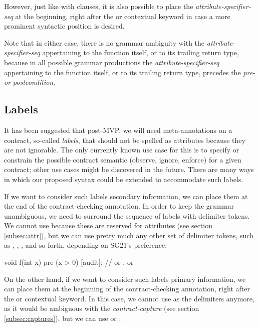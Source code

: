 However, just like with  clauses, it is also possible to place the \emph{attribute-specifier-seq} at the beginning, right after the  or  contextual keyword in case a more prominent syntactic position is desired.

Note that in either case, there is no grammar ambiguity with the \emph{attribute-specifier-seq} appertaining to the function itself, or to its trailing return type, because in all possible grammar productions the \emph{attribute-specifier-seq} appertaining to the function itself, or to its trailing return type, precedes the \emph{pre-or-postcondition}.

\subsection{Labels}
\label{subsec:labels}

It has been suggested that post-MVP, we will need meta-annotations on a contract, so-called \emph{labels}, that should not be spelled as attributes because they are not ignorable. The only currently known use case for this is to specify or constrain the possible contract semantic (observe, ignore, enforce) for a given contract; other use cases might be discovered in the future. There are many ways in which our proposed syntax could be extended to accommodate such labels.

If we want to consider such labels secondary information, we can place them at the end of the contract-checking annotation. In order to keep the grammar unambiguous, we need to surround the sequence of labels with delimiter tokens. We cannot use \tcode{[[ ... ]]} because these are reserved for attributes (see section \ref{subsec:attr}), but we can use pretty much any other set of delimiter tokens, such as \mbox{\tcode{[ ...]}}, \mbox{}, \mbox{}, and so forth, depending on SG21's preference:

\vspace{2mm}
\begin{codeblock}
void f(int x)
  pre (x > 0) [audit];   // or , or 
\end{codeblock}
\vspace{2mm}

On the other hand, if we want to consider such labels primary information, we can place them at the beginning of the contract-checking annotation, right after the  or  contextual keyword. In this case, we cannot use \mbox{\tcode{[...]}} as the delimiters anymore, as it would be ambiguous with the \emph{contract-capture} (see section \ref{subsec:captures}), but we can use \mbox{} or \mbox{}:

